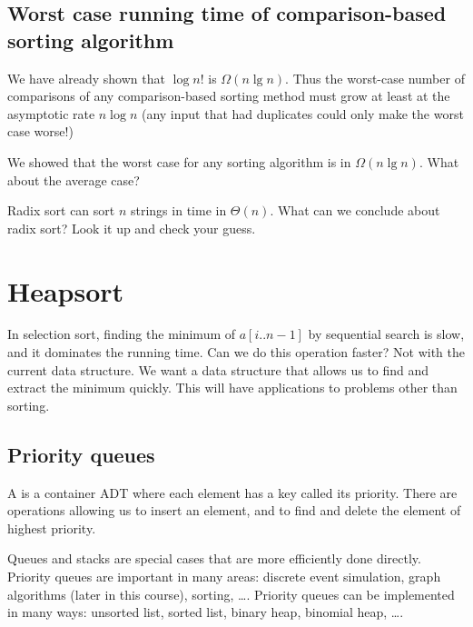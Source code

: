 \section{Worst case running time of comparison-based sorting algorithm}

We have already shown that $\log n!$ is $\Omega (n \lg n)$. Thus the 
worst-case number of comparisons of any comparison-based sorting method must 
grow at least at the asymptotic rate $n \log n$ (any input that had duplicates 
could only make the worst case worse!)

\begin{Boxample}[4]
We showed that the worst case for any sorting algorithm is in $\Omega (n \lg n)$. What about the average case?

\end{Boxample}

\begin{Boxample}[2]
Radix sort can sort $n$ strings in time in $\Theta(n)$.
 What can we conclude about radix sort? Look it up and check your guess.
\end{Boxample}



\chapter{Heapsort} %
\label{sec:heapsort}

In selection sort, finding the minimum of $a[i..n-1]$ by sequential 
search is slow, and it dominates the running time. Can we do this operation 
faster?
Not with the current data structure. 
We want a data structure that allows us to find and extract the minimum quickly. 
This will have applications to problems other than sorting.


\section{Priority queues}
\begin{Definition}
A  is a container ADT where each element 
has a key called its priority. There are operations allowing us to insert an 
element, and to find and delete the element of highest priority. 
\end{Definition}
Queues and stacks are special cases that are more efficiently done directly.
Priority queues are important in many areas: discrete event simulation, 
graph algorithms (later in this course), sorting, \dots .
Priority queues can be implemented in many ways: unsorted list, sorted 
list, binary heap, binomial heap, \dots . 

